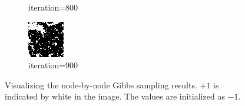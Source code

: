 \documentclass{article}
\begin{document}
\begin{figure}[h]
\begin{subfigure}[t]{0.18\textwidth}
\vspace{-0.6cm}
\caption{iteration=800}
\end{subfigure}\hspace{0.01\textwidth}
\begin{subfigure}[t]{0.18\textwidth}
\centering
\includegraphics[width=\textwidth]{./computational/results/gibbs_node_sampler_negative_iter_900.png}
\vspace{-0.6cm}
\caption{iteration=900}
\end{subfigure}\hspace{0.01\textwidth}
\caption{Visualizing the node-by-node Gibbs sampling results. $+1$ is indicated by white in the image. The values are initialized as $-1$.}
\label{f:63b}
\end{figure}
%
\end{document}
